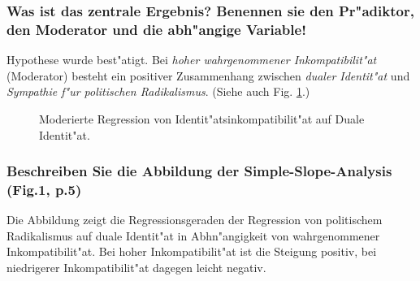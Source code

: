 \subsubsection{Was ist das zentrale Ergebnis? Benennen sie den Pr"adiktor, den Moderator und die abh"angige Variable!}
Hypothese wurde best"atigt. Bei \emph{hoher wahrgenommener Inkompatibilit"at} (Moderator) besteht ein positiver Zusammenhang zwischen \emph{dualer Identit"at} und \emph{Sympathie f"ur politischen Radikalismus}. (Siehe auch Fig. \ref{fig:simon1}.)

\begin{figure}[h!]
        \begin{center}
        \end{center}
        \caption{Moderierte Regression von Identit"atsinkompatibilit"at auf Duale Identit"at.}
        \label{fig:simon1}
\end{figure}

\subsubsection{Beschreiben Sie die Abbildung der Simple-Slope-Analysis (Fig.1, p.5)}
Die Abbildung zeigt die Regressionsgeraden der Regression von politischem Radikalismus auf duale Identit"at in Abhn"angigkeit von wahrgenommener Inkompatibilit"at. Bei hoher Inkompatibilit"at ist die Steigung positiv, bei niedrigerer Inkompatibilit"at dagegen leicht negativ.

